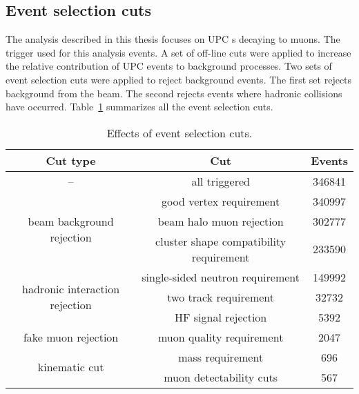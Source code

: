     \subsection{Event selection cuts}
      The analysis described in this thesis focuses on UPC \JPsi{}s decaying to 
        muons. 
      The trigger used for this analysis \DIFdelbegin {}\DIFdelend \DIFaddbegin {} events.
      A set of off-line cuts were applied to increase the relative contribution 
        of UPC events to background processes. 
      Two sets of event selection cuts were applied to reject background events. 
      The first set rejects background from the beam.
      The second rejects events where hadronic collisions have occurred.
      Table~\ref{tab:evSelCutNumbers} summarizes all the event selection cuts. 
      \begin{table}[!Hhbt]
        \centering
        \begin{tabular}{|c|c|c|} \hline 
          Cut type & Cut & Events \\ \hline
          -- & all triggered & 346841 \\ \hline
          \multirow{3}{*}{beam background rejection} & good vertex requirement & 340997 \\ \hhline{~--}
          & beam halo muon rejection & 302777 \\ \hhline{~--}
          & cluster shape compatibility requirement & 233590 \\ \hline
          \multirow{3}{*}{hadronic interaction rejection} & single-sided neutron requirement & 149992 \\ \hhline{~--}
          & two track requirement & 32732 \\ \hhline{~--}
          & HF signal rejection & 5392 \\ \hline
          fake muon rejection & muon quality requirement & 2047 \\ \hline
          \multirow{2}{*}{kinematic cut} & \JPsi{} mass requirement & 696 \\ \hhline{~--}
          & muon detectability cuts & 567 \\ \hline
        \end{tabular}
        \caption{Effects of event selection cuts.}
        \label{tab:evSelCutNumbers}
      \end{table}

